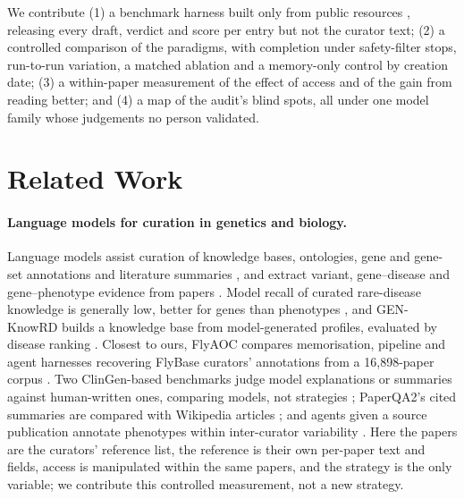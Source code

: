 \documentclass{article} %
\begin{document}
We contribute (1) a benchmark harness built only from public resources \citep{sayers2026database,Louden2020MedgenNcbis,rosonovski2024europe,seal2023genenames}, releasing every draft, verdict and score per entry but not the curator text; (2) a controlled comparison of the paradigms, with completion under safety-filter stops, run-to-run variation, a matched ablation and a memory-only control by creation date; (3) a within-paper measurement of the effect of access and of the gain from reading better; and (4) a map of the audit's blind spots, all under one model family whose judgements no person validated.

\section{Related Work}
\label{sec:related_work}
\paragraph{Language models for curation in genetics and biology.}
Language models assist curation of knowledge bases, ontologies, gene and gene-set annotations and literature summaries \citep{caufield2024structured,caufield2024curategpt,toro2024dynamic,Li2025GenewhispererEnhancing,hu2025evaluation,niyonkuru2025leveraging,Green2026GoflowllmcuratingMirna,Murphy2024HarnessingGenerative,Green2023LitsummLarge}, and extract variant, gene--disease and gene--phenotype evidence from papers \citep{li2025autopm3,furlan2025eagleai,wang2026pubmind,yin2026benchmarking,twede2026evidence}. Model recall of curated rare-disease knowledge is generally low, better for genes than phenotypes \citep{groza2026systematic}, and GEN-KnowRD builds a knowledge base from model-generated profiles, evaluated by disease ranking \citep{yan2026genknowrd}. Closest to ours, FlyAOC compares memorisation, pipeline and agent harnesses recovering FlyBase curators' annotations from a 16,898-paper corpus \citep{zhang2026flyaoc}. Two ClinGen-based benchmarks judge model explanations or summaries against human-written ones, comparing models, not strategies \citep{queen2025cgbench,Saadat2026LargeLanguage}; PaperQA2's cited summaries are compared with Wikipedia articles \citep{skarlinski2024language}; and agents given a source publication annotate phenotypes within inter-curator variability \citep{balhoff2026frontier}. Here the papers are the curators' reference list, the reference is their own per-paper text and fields, access is manipulated within the same papers, and the strategy is the only variable; we contribute this controlled measurement, not a new strategy.
\end{document}
